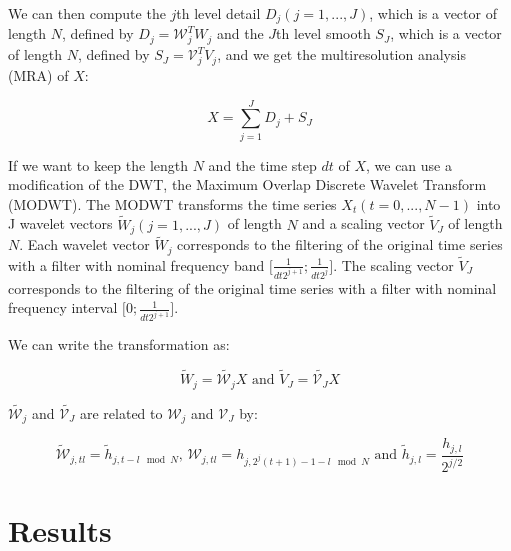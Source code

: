 \documentclass[main.tex]{subfiles}
\begin{document}
We can then compute the $j$th level detail $D_j \left( j = 1 , ... , J \right)$, which is a vector of length $N$, defined by $D_j = \mathcal{W}_j^T W_j$ and the $J$th level smooth $S_J$, which is a vector of length $N$, defined by $S_J = \mathcal{V}_j^T V_j$, and we get the multiresolution analysis (MRA) of $X$:

\begin{equation}
X = \sum_{j = 1}^{J} D_j + S_J
\end{equation}

If we want to keep the length $N$ and the time step $dt$ of $X$, we can use a modification of the DWT, the Maximum Overlap Discrete Wavelet Transform (MODWT). The MODWT transforms the time series $X_t \left( t = 0, ... , N - 1 \right)$ into J wavelet vectors $\widetilde{W}_j \left( j = 1 , ... , J \right)$ of length $N$ and a scaling vector $\widetilde{V}_J$ of length $N$. Each wavelet vector $\widetilde{W}_j$ corresponds to the filtering of the original time series with a filter with nominal frequency band $\lbrack \frac{1}{dt 2^{j + 1}} ; \frac{1}{dt 2^j} \rbrack$. The scaling vector $\widetilde{V}_J$ corresponds to the filtering of the original time series with a filter with nominal frequency interval $\lbrack 0 ; \frac{1}{dt 2^{j + 1}} \rbrack$.

We can write the transformation as:

\begin{equation}
\widetilde{W}_j = \widetilde{\mathcal{W}_j} X \text{ and } \widetilde{V}_J = \widetilde{\mathcal{V}_J} X
\end{equation}

$ \widetilde{\mathcal{W}_j}$ and $\widetilde{\mathcal{V}_J}$ are related to $\mathcal{W}_j$ and $\mathcal{V}_J$ by:

\begin{equation}
\widetilde{\mathcal{W}}_{j, t l} = \widetilde{h}_{j , t - l \mod N} \text{, } \mathcal{W}_{j, t l} = h_{j , 2^j \left( t + 1 \right) - 1 - l \mod N} \text{ and } \widetilde{h}_{j , l} = \frac{h_{j , l}}{2^{j/2}}
\end{equation}

\chapter{Results}
\end{document}
